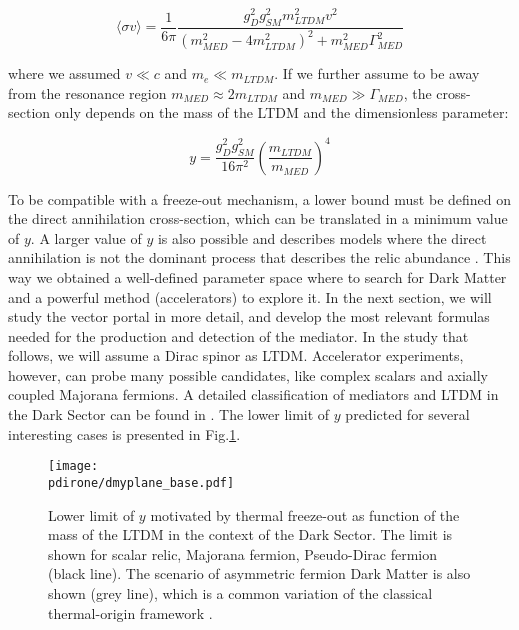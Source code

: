   \begin{equation}
    \label{eq:dm-cs-fo}
    \langle \sigma v \rangle = \frac{1}{6\pi}\frac{g^2_D g^2_{SM} m^2_{LTDM} v^2}{(m^2_{MED} - 4m^2_{LTDM})^2 + m^2_{MED}\Gamma^2_{MED}}
    \end{equation}

    
    where we assumed $v \ll c$ and $m_e \ll m_{LTDM}$. If we further assume to be away from the resonance region $m_{MED} \approx 2m_{LTDM}$ and $m_{MED} \gg \Gamma_{MED}$, the cross-section only depends on the mass of the LTDM and the dimensionless parameter:

    \begin{equation}
      \label{eq:dmplane-y}
      y = \frac{g^2_D g^2_{SM}}{16 \pi^2} \left( \frac{m_{LTDM}}{m_{MED}} \right)^4
    \end{equation}

    To be compatible with a freeze-out mechanism, a lower bound must be defined on the direct annihilation cross-section, which can be translated in a minimum value of $y$. A larger value of $y$ is also possible and describes models where the direct annihilation is not the dominant process that describes the relic abundance \cite{battaglieri2017cosmic}. This way we obtained a well-defined parameter space where to search for Dark Matter and a powerful method (accelerators) to explore it. In the next section, we will study the vector portal in more detail, and develop the most relevant formulas needed for the production and detection of the mediator. In the study that follows, we will assume a Dirac spinor as LTDM. Accelerator experiments, however, can probe many possible candidates, like complex scalars and axially coupled Majorana fermions. A detailed classification of mediators and LTDM in the Dark Sector can be found in \cite{PhysRevD.92.123531}. The lower limit of $y$ predicted for several interesting cases is presented in Fig.\ref{fig:dmyplane-base}.

    \begin{figure}[bth!]
      \centering
      \texttt{[image: \\pdirone/dmyplane\_base.pdf]}
      \caption[Lower limit of $y$ in dark sector]{Lower limit of $y$ motivated by thermal freeze-out as function of the mass of the LTDM in the context of the Dark Sector. The limit is shown for scalar relic, Majorana fermion, Pseudo-Dirac fermion (black line). The scenario of asymmetric fermion Dark Matter is also shown (grey line), which is a common variation of the classical thermal-origin framework \cite{battaglieri2017cosmic}.}
      \label{fig:dmyplane-base}
    \end{figure}

